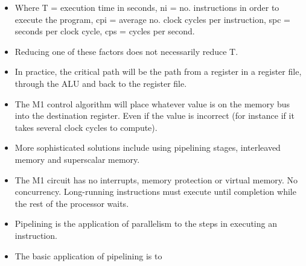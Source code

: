 \documentclass{article}
\begin{document}
\begin{itemize}
\item Where T = execution time in seconds, ni = no. instructions in order to execute the program, cpi = average no. clock cycles per instruction, spc = seconds per clock cycle, cps = cycles per second.
\item Reducing one of these factors does not necessarily reduce T.
\item In practice, the critical path will be the path from a register in a register file, through the ALU and back to the register file.
\item The M1 control algorithm will place whatever value is on the memory bus into the destination register. Even if the value is incorrect (for instance if it takes several clock cycles to compute).
\item More sophisticated solutions include using pipelining stages, interleaved memory and superscalar memory.
\item The M1 circuit has no interrupts, memory protection or virtual memory. No concurrency. Long-running instructions must execute until completion while the rest of the processor waits.
\item Pipelining is the application of parallelism to the steps in executing an instruction.
\item The basic application of pipelining is to 
\end{itemize}
\end{document}
